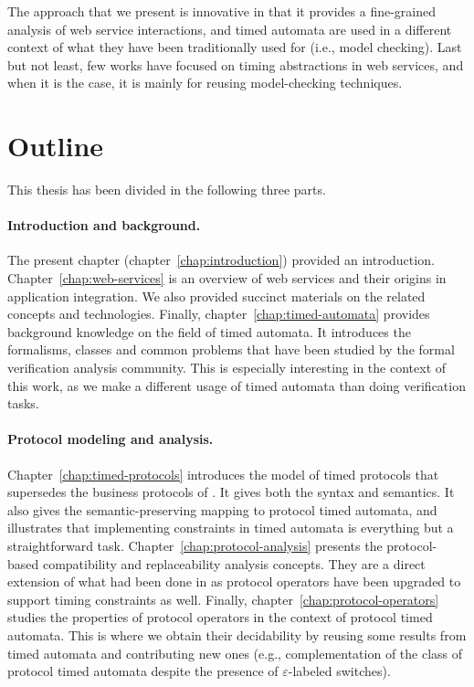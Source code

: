 The approach that we present is innovative in that it provides a fine-grained analysis of web service interactions, and timed automata are used in a different context of what they have been traditionally used for (i.e., model checking). Last but not least, few works have focused on timing abstractions in web services, and when it is the case, it is mainly for reusing model-checking techniques.


\section{Outline}


This thesis has been divided in the following three parts.

\paragraph{Introduction and background.}
The present chapter (chapter~\ref{chap:introduction}) provided an introduction. Chapter~\ref{chap:web-services} is an overview of web services and their origins in application integration. We also provided succinct materials on the related concepts and technologies. Finally, chapter~\ref{chap:timed-automata} provides background knowledge on the field of timed automata. It introduces the formalisms, classes and common problems that have been studied by the formal verification analysis community. This is especially interesting in the context of this work, as we make a different usage of timed automata than doing verification tasks.

\paragraph{Protocol modeling and analysis.}
Chapter~\ref{chap:timed-protocols} introduces the model of timed protocols that supersedes the business protocols of \cite{FTBB}. It gives both the syntax and semantics. It also gives the semantic-preserving mapping to protocol timed automata, and illustrates that implementing \MInvoke constraints in timed automata is everything but a straightforward task. Chapter~\ref{chap:protocol-analysis} presents the protocol-based compatibility and replaceability analysis concepts. They are a direct extension of what had been done in \cite{FTBB} as protocol operators have been upgraded to support timing constraints as well. Finally, chapter~\ref{chap:protocol-operators} studies the properties of protocol operators in the context of protocol timed automata. This is where we obtain their decidability by reusing some results from timed automata and contributing new ones (e.g., complementation of the class of protocol timed automata despite the presence of $\varepsilon$-labeled switches).

